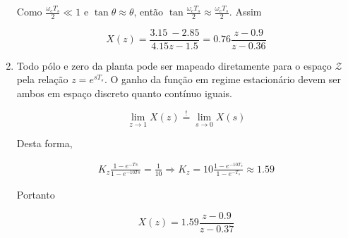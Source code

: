 \begin{enumerate}
        Como $\frac{\omega_c T_s}{2} \ll 1$ e $\tan{\theta} \approx \theta$, então $\tan{\frac{\omega_c T_s}{2}} \approx \frac{\omega_c T_s}{2}$. Assim
        
            \begin{equation}
                X(z) = \frac{3.15\ - 2.85}{4.15z - 1.5} = 0.76 \frac{z - 0.9}{z - 0.36}
            \end{equation}
        
        \item %
        
        Todo pólo e zero da planta pode ser mapeado diretamente para o espaço $\mathcal{Z}$ pela relação $z = e^{s T_s}$. O ganho da função em regime estacionário devem ser ambos em espaço discreto quanto contínuo iguais.
        
            \begin{equation}
                \lim\limits_{z \rightarrow 1} X(z) \stackrel{!}{=} \lim\limits_{s \rightarrow 0} X(s) 
            \end{equation}
        
        Desta forma,
        
            \begin{equation*}
                \begin{split}
                    K_z \frac{1 - e^{-Ts}}{1 - e^{-10Ts}} = \frac{1}{10} \Rightarrow K_z = 10 \frac{1 - e^{-10T_s}}{1 - e^{-T_s}} \approx 1.59
                \end{split}
            \end{equation*}
            
        Portanto
        
            \begin{equation}
                X(z) = 1.59 \frac{z - 0.9}{z - 0.37}
            \end{equation}
        
    \end{enumerate}